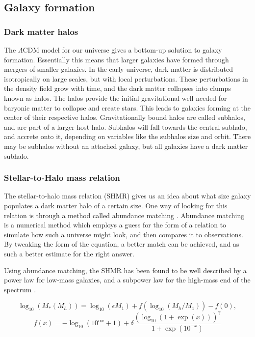 \subsection{Galaxy formation}

\subsubsection{Dark matter halos}
The $\Lambda$CDM model for our universe gives a bottom-up solution to galaxy formation. Essentially this means that larger galaxies have formed through mergers of smaller galaxies. In the early universe, dark matter is distributed isotropically on large scales, but with local perturbations. These perturbations in the density field grow with time, and the dark matter collapses into clumps known as halos. The halos provide the initial gravitational well needed for baryonic matter to collapse and create stars. This leads to galaxies forming at the center of their respective halos. Gravitationally bound halos are called subhalos, and are part of a larger host halo. Subhalos will fall towards the central subhalo, and accrete onto it, depending on variables like the subhalos size and orbit. There may be subhalos without an attached galaxy, but all galaxies have a dark matter subhalo.

\subsubsection{Stellar-to-Halo mass relation}
The stellar-to-halo mass relation (SHMR) gives us an idea about what size galaxy populates a dark matter halo of a certain size. One way of looking for this relation is through a method called abundance matching \parencite{None2000}. Abundance matching is a numerical method which employs a guess for the form of a relation to simulate how such a universe might look, and then compares it to observations. By tweaking the form of the equation, a better match can be achieved, and as such a better estimate for the right answer. 

Using abundance matching, the SHMR has been found to be well described by a power law for low-mass galaxies, and a subpower law for the high-mass end of the spectrum \parencite{Behroozi2013}. 

\begin{equation}
    \log_{10}(M_*(M_h)) = \log_{10}(\epsilon M_1) + f(\log_{10}(M_h/M_1)) -f(0),
\end{equation}
\begin{equation*}
    f(x) = -\log_{10}(10^{\alpha x}+1)+\delta \frac{(\log_{10}(1+\exp(x)))^\gamma}{1 +\exp(10^{-x})}
\end{equation*}

